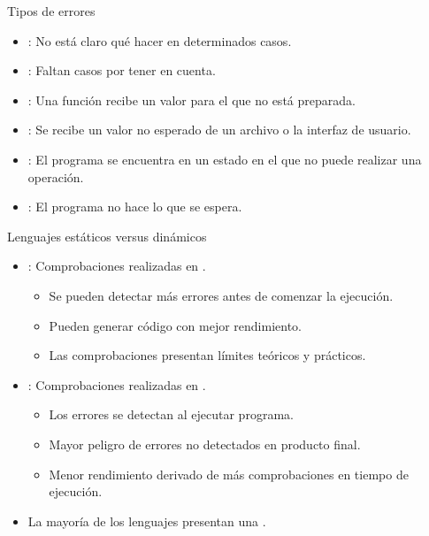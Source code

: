 \begin{frame}[t]{Tipos de errores}
\begin{itemize}
  \item {}:
        No está claro qué hacer en determinados casos.

  \item {}:
        Faltan casos por tener en cuenta.

  \item {}:
        Una función recibe un valor para el que no está preparada.

  \item {}:
        Se recibe un valor no esperado de un archivo o
        la interfaz de usuario.

  \item {}:
        El programa se encuentra en un estado en el que no puede 
        realizar una operación.

  \item {}:
        El programa no hace lo que se espera.
\end{itemize}
\end{frame}

\begin{frame}[t]{Lenguajes estáticos versus dinámicos}
\begin{itemize}
  \item {}: Comprobaciones realizadas en 
        .
    \begin{itemize}
      \item Se pueden detectar más errores antes de comenzar la ejecución.
      \item Pueden generar código con mejor rendimiento.
      \item Las comprobaciones presentan límites teóricos y prácticos.
    \end{itemize}

  \item {}: Comprobaciones realizadas en 
        .
    \begin{itemize}
      \item Los errores se detectan al ejecutar programa.
      \item Mayor peligro de errores no detectados en producto final.
      \item Menor rendimiento derivado de más comprobaciones en tiempo de ejecución.
    \end{itemize}

  \item La mayoría de los lenguajes presentan una 
        .
\end{itemize}
\end{frame}

